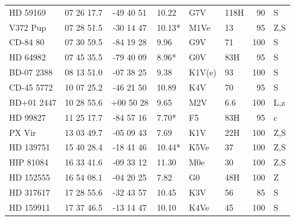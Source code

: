 \documentclass[11pt,twoside]{book}
\begin{document}
\begin{table}[]
{\begin{tabular}{l@{\hskip7pt}ccl
l@{\hskip7pt}lr@{\hskip7pt}l}
HD 59169   &07 26 17.7    &-49 40 51&      10.22  &       G7V   &118H &  90&S\\
V372 Pup   &07 28 51.5    &-30 14 47&      10.13*    &M1Ve   &\hspace{2mm}13 & 95&Z,S\\
CD-84 80   &07 30 59.5    &-84 19 28&      \hspace{2mm}9.96         &G9V  &\hspace{2mm}71&  100&S\\
HD 64982   &07 45 35.5    &-79 40 09&       \hspace{2mm}8.96* &   G0V  &\hspace{2mm}83H&  95&S\\
BD-07 2388 &08 13 51.0    &-07 38 25&       \hspace{2mm}9.38&   K1V(e) &\hspace{2mm}93&  100&S\\
CD-45 5772 &10 07 25.2    &-46 21 50&        10.89  &    K4V  & \hspace{2mm}70&95&S\\
BD+01 2447  &10 28 55.6   &+00 50 28&       \hspace{2mm}9.65   &M2V &\hspace{4mm}6.6&100&L,z\\
HD 99827   &11 25 17.7    &-84 57 16&      \hspace{2mm}7.70*    &F5  &\hspace{2mm}83H&95&c\\
PX Vir    &13 03 49.7     &-05 09 43&       \hspace{2mm}7.69  &   K1V  &\hspace{2mm}22H&  100&Z,S\\
HD 139751  &15 40 28.4    &-18 41 46&      10.44* &   K5Ve &\hspace{2mm}37&100&Z,S\\
HIP 81084  &16 33 41.6    &-09 33 12&      11.30  &   M0e   &\hspace{2mm}30& 100&Z,S\\
HD 152555  &16 54 08.1    &-04 20 25&       \hspace{2mm}7.82  &   G0   &\hspace{2mm}48H&  100&Z\\
HD 317617  &17 28 55.6    &-32 43 57&         10.45&K3V                 &\hspace{2mm}56& 85&S\\
HD 159911  &17 37 46.5    &-13 14 47&       10.10& K4Ve& \hspace{2mm}45 &100&S\\

\end{tabular}}
\end{table}
\end{document}
